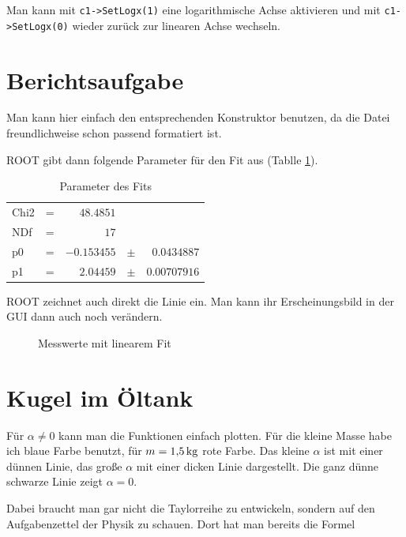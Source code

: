 Man kann mit \texttt{c1->SetLogx(1)} eine logarithmische Achse aktivieren und mit \texttt{c1->SetLogx(0)} wieder zurück zur linearen Achse wechseln.

\section{Berichtsaufgabe}

Man kann hier einfach den entsprechenden Konstruktor benutzen, da die Datei freundlichweise schon passend formatiert ist.


ROOT gibt dann folgende Parameter für den Fit aus (Tablle \ref{table:fit}).

\begin{table}[h]
\begin{center}
\begin{tabular}{lcrcr}
Chi2 & = & $48.4851$ &  \\ 
NDf & = & $17$ &  \\ 
p0 & = & $-0.153455$ & $\pm$ & $0.0434887$ \\ 
p1 & = & $2.04459$ & $\pm$ & $0.00707916$ \\ 
\end{tabular} 
\caption{Parameter des Fits}
\label{table:fit}
\end{center}
\end{table}

ROOT zeichnet auch direkt die Linie ein. Man kann ihr Erscheinungsbild in der GUI dann auch noch verändern.


\begin{figure}[h]
\begin{center}
\caption{Messwerte mit linearem Fit}
\end{center}
\end{figure}

\section{Kugel im Öltank}

Für $\alpha \neq 0$ kann man die Funktionen einfach plotten. Für die kleine Masse habe ich blaue Farbe benutzt, für $m=\unit[1{,}5]{kg}$ rote Farbe. Das kleine $\alpha$ ist mit einer dünnen Linie, das große $\alpha$ mit einer dicken Linie dargestellt. Die ganz dünne schwarze Linie zeigt $\alpha = 0$.

Dabei braucht man gar nicht die Taylorreihe zu entwickeln, sondern auf den Aufgabenzettel der Physik zu schauen. Dort hat man bereits die Formel


